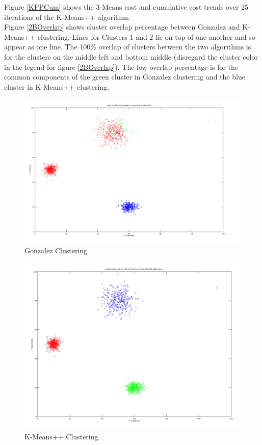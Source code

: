 \documentclass[11pt]{article}
\begin{document}
Figure \ref{KPPCum} shows the 3-Means cost and cumulative cost trends over $25$ iterations of the K-Means++ algorithm.\\

Figure \ref{2BOverlap} shows cluster overlap percentage between Gonzalez and K-Means++ clustering. Lines for Clusters 1 and 2 lie on top of one another and so appear as one line. The 100\% overlap of clusters between the two algorithms is for the clusters on the middle left and bottom middle (disregard the cluster color in the legend for figure \ref{2BOverlap}). The low overlap percentage is for the common components of the green cluster in Gonzalez clustering and the blue cluster in K-Means++ clustering.

\begin{figure}[!htb]
\centering
\includegraphics[width=5in]{figures/2AGonzalez.png}
\caption{Gonzalez Clustering}
\label{Gonzalez}
\end{figure}

\begin{figure}[!htb]
\centering
\includegraphics[width=5in]{figures/2AKmeansPP.png}
\caption{K-Means++ Clustering}
\label{KMPP}
\end{figure}
\end{document}
